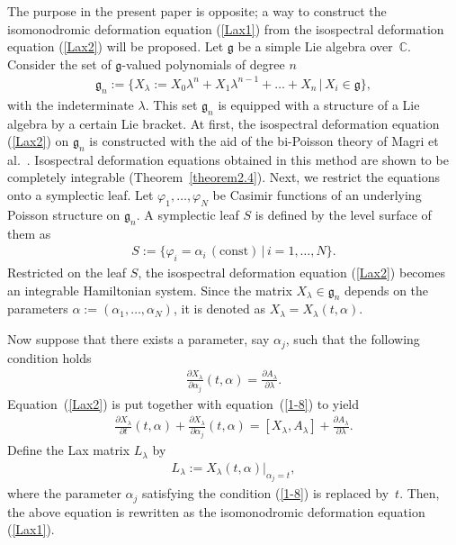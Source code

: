 \documentclass[pdftex]{sigma}
\numberwithin{equation}{section}
\begin{document}
The purpose in the present paper is opposite; a way to construct the isomonodromic deformation equation (\ref{Lax1}) from the isospectral deformation equation (\ref{Lax2}) will be proposed. Let $\mathfrak{g}$ be a simple Lie algebra over~$\mathbb{C}$. Consider the set of $\mathfrak{g}$-valued polynomials of degree $n$
\begin{gather*}
\mathfrak{g}_n:= \big\{ X_\lambda := X_0 \lambda ^n + X_1\lambda ^{n-1} + \dots + X_n \, | \, X_i\in \mathfrak{g}\big\},
\end{gather*}
with the indeterminate $\lambda $. This set $\mathfrak{g}_n$ is equipped with a structure of a Lie algebra by a certain Lie bracket. At f\/irst, the isospectral deformation equation (\ref{Lax2}) on $\mathfrak{g}_n$ is constructed with the aid of the bi-Poisson theory of Magri et al.~\cite{Mag1, Mag2, Mag3, Mag4}. Isospectral deformation equations obtained in this method are shown to be completely integrable (Theorem~\ref{theorem2.4}). Next, we restrict the equations onto a symplectic leaf. Let $\varphi _1 , \dots ,\varphi _N$ be Casimir functions of an underlying Poisson structure on $\mathfrak{g}_n$.
A symplectic leaf $S$ is def\/ined by the level surface of them as
\begin{gather*}
S:=\{ \varphi _i= \alpha _i \, (\text{const}) \, | \, i=1, \dots ,N\}.
\end{gather*}
Restricted on the leaf $S$, the isospectral deformation equation (\ref{Lax2}) becomes an integrable Hamiltonian system. Since the matrix $X_\lambda \in \mathfrak{g}_n$ depends on the parameters $\alpha := (\alpha_1, \dots ,\alpha _N)$, it is denoted as $X_\lambda = X_\lambda (t, \alpha )$.

Now suppose that there exists a parameter, say $\alpha _{j}$, such that the following condition holds
\begin{gather}
\frac{\partial X_\lambda }{\partial \alpha _{j}}(t, \alpha ) = \frac{\partial A_\lambda }{\partial \lambda }.\label{1-8}
\end{gather}
Equation~(\ref{Lax2}) is put together with equation~(\ref{1-8}) to yield
\begin{gather*}
\frac{\partial X_\lambda}{\partial t}(t,\alpha ) + \frac{\partial X_\lambda }{\partial \alpha _{j}}(t, \alpha )
 = [X_\lambda , A_\lambda ]+\frac{\partial A_\lambda }{\partial \lambda }.
\end{gather*}
Def\/ine the Lax matrix $L_\lambda $ by
\begin{gather*}
L_\lambda := X_\lambda (t, \alpha )|_{\alpha _{j} = t},
\end{gather*}
where the parameter $\alpha _{j}$ satisfying the condition (\ref{1-8}) is replaced by~$t$. Then, the above equation is rewritten as the isomonodromic deformation equation (\ref{Lax1}).
\end{document}
